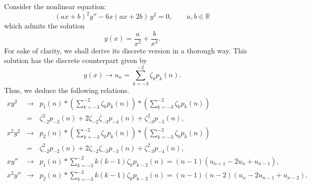 \documentclass[10pt]{amsart}
\numberwithin{equation}{section}
\theoremstyle{definition}
\begin{document}
Consider the nonlinear equation:
\begin{equation}
\label{cont}
(ax+b)^{2}y''-6x(ax+2b)\, y^{2} =0, \qquad a,b\in \mathbb{R}
\end{equation}
which admits the solution
\begin{equation}
\label{eq:10.16}
y(x)= \frac{a}{x^{2}}+ \frac{b}{x^{3}}.
\end{equation}
For sake of clarity, we shall derive its discrete version in a thorough
way. This solution has the discrete counterpart given by
\begin{equation}
y(x)\to u_{n}=\sum _{k=-3}^{-2}\zeta _{k}p_{k}(n).
\label{eq11.10}
\end{equation}
Thus, we deduce the following relations.
\begin{eqnarray*}
xy^{2} &\to & p_{1}(n)*\left (\sum _{k=-3}^{-2}\zeta _{k}p_{k}(n)
\right )*\left (\sum _{k=-3}^{-2}\zeta _{k}p_{k}(n)\right )
\\
&=&\zeta _{-2}^{2}p_{-3}(n)+2\zeta _{-2}\zeta _{-3}p_{-4}(n)+\zeta _{-3}^{2}p_{-5}(n),
\\
x^{2}y^{2} &\to & p_{2}(n)*\left (\sum _{k=-3}^{-2}\zeta _{k}p_{k}(n)
\right )*\left (\sum _{k=-3}^{-2}\zeta _{k}p_{k}(n)\right )
\\
&=&\zeta _{-2}^{2}p_{-2}(n)+2\zeta _{-2}\zeta _{-3}p_{-3}(n)+\zeta _{-3}^{2}p_{-4}(n),
\\
xy'' &\to & p_{1}(n)*\sum _{k=-3}^{-2}k(k-1)\zeta _{k}p_{k-2}(n) = (n-1)(u_{n+1}-2u_{n
}+u_{n-1}),
\\
x^{2}y'' &\to & p_{2}(n)*\sum _{k=-3}^{-2}k(k-1)\zeta _{k}p_{k-2}(n)= (n-1)(n-2)(u_{n}-2u_{n-1}+u_{n-2}).
\end{eqnarray*}
\end{document}
